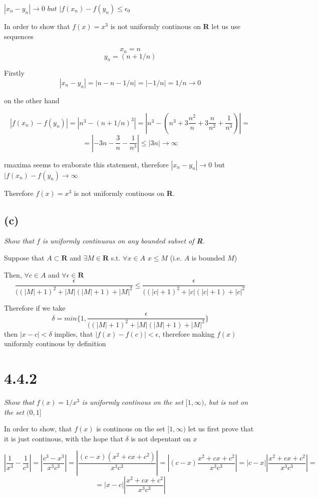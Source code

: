 \documentclass[11pt,oneside,titlepage]{article}
\begin{document}
$|x_n - y_n| \to 0$ $but$ $|f(x_n) - f(y_n) \leq \epsilon_0$

In order to show that $f(x) = x^3$ is not uniformly continous on
\textbf{R} let us use sequences

$$x_n = n$$
$$y_n = (n + 1/n)$$

Firstly
$$ |x_n - y_n| = |n - n - 1/n| = |-1/n| = 1/n \to 0$$

on the other hand

$$|f(x_n) - f(y_n)| = |n ^ 3 - (n + 1/n) ^ 3| = |n^3 - (n^3 + 3 \frac{n^2}{n}
+ 3 \frac{n}{n^2} + \frac{1}{n^3})| = $$
$$ = |-3n - \frac{3}{n} - \frac{1}{n^3} | \leq |3n| \to \infty$$

rmaxima seems to eraborate this statement, therefore  $|x_n - y_n| \to 0$
but $|f(x_n) - f(y_n) \to \infty$

Therefore $f(x) = x^3$ is not uniformly continous on \textbf{R}.

\subsection*{(c)}
\textit{Show that $f$ is uniformly continuous on any bounded subset
  of \textbf{R}.}

Suppose that $A \subset \textbf{R}$ and $\exists M \in \textbf{R}$ s.t.
$\forall x \in A$ $x \leq M$ (i.e. $A$ is bounded $M$)

Then, $\forall c \in A$ and $\forall \epsilon \in \textbf{R}$
$$\frac{\epsilon}{((|M| + 1)^{2} + |M|(|M| + 1) + |M|^2}  \leq
\frac{\epsilon}{((|c| + 1)^{2} + |c|(|c| + 1) + |c|^2} $$

Therefore if we take
$$\delta = min\{1, \frac{\epsilon}{((|M| + 1)^{2} + |M|(|M| + 1) + |M|^2}\} $$
then $|x - c| < \delta$ implies, that $ |f(x) - f(c)| < \epsilon$, therefore
making $f(x)$ uniformly continous by definition


\section*{4.4.2}
\textit{Show that $f(x) = 1/x^3$  is uniformly continous on the set
  $[1, \infty)$, but is not on the set $(0, 1]$}

In order to show, that $f(x)$ is continous on the set $[1, \infty)$ let us
first prove that it is just continous, with the hope that $\delta$ is not
depentant on $x$

$$ |\frac{1}{x^3} - \frac{1}{c^3}| = |\frac{c^3 - x^3}{x^3c^3}| =
|\frac{(c - x)(x^2 + cx + c^2)}{x^3c^3}|
= |(c - x) \frac{x^2 + cx + c^2}{x^3c^3}| =
|c - x||\frac{x^2 + cx + c^2}{x^3c^3}| =$$
$$ = |x - c||\frac{x^2 + cx + c^2}{x^3c^3}| $$
\end{document}
